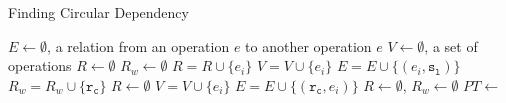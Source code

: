 \begin{algorithm}
\caption{Finding Circular Dependency}\label{algo:circular}
\begin{algorithmic}[1]
\State $\mathit{E} \gets \emptyset$, a relation from an operation $\mathit{e}$ to another operation $\mathit{e}$
\State $\mathit{V} \gets \emptyset$, a set of operations
\State $\mathit{R} \gets \emptyset$
\State $\mathit{R_w} \gets \emptyset$
\State $\mathit{R} = \mathit{R} \cup \{\mathit{e_i}\}$
\State $\mathit{V} = \mathit{V} \cup \{\mathit{e_i}\}$
 
\State $\mathit{E} = \mathit{E} \cup \{(\mathit{e_i},\mathtt{s_l})\}$  
\EndFor
\EndIf
{}
\State $\mathit{R_w} = \mathit{R_w} \cup \{\mathtt{r_c}\}$
\EndFor
\State $\mathit{R} \gets \emptyset$ 
\EndIf
{}
\State $\mathit{V} = \mathit{V} \cup \{\mathit{e_i}\}$
  
\State $\mathit{E} = \mathit{E} \cup \{(\mathtt{r_c},\mathit{e_i})\}$
\EndFor
\EndIf
\EndFor
\State $\mathit{R} \gets \emptyset$, $\mathit{R_w} \gets \emptyset$
\EndFor
\State $\mathit{PT} \gets$ 
\end{algorithmic}
\end{algorithm}

